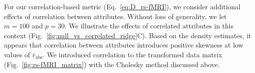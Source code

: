 \documentclass[aos]{imsart}
\begin{document}
For our correlation-based metric
%
\noindent (Eq.~\ref{eq:D_rs-fMRI}), we consider additional effects of correlation between attributes. Without loss of generality, we let $m=100$ and $p=30$. We illustrate the effects of correlated attributes in this context (Fig.~\ref{fig:null_vs_correlated_ridge}C). Based on the density estimates, it appears that correlation between attributes introduces positive skewness at low values of $\bar{r}_\text{abs}$. We introduced correlation to the transformed data matrix (Fig.~\ref{fig:rs-fMRI_matrix}) with the Cholesky method discussed above.
%

\end{document}
